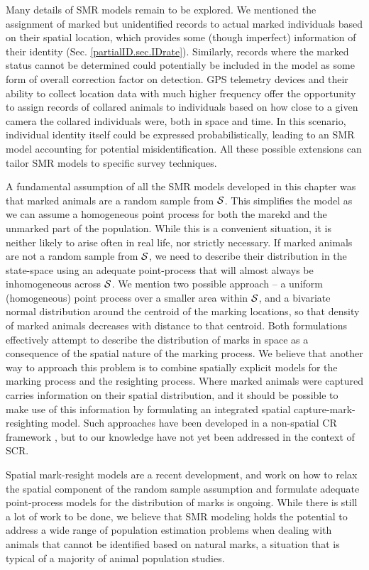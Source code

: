 Many details of SMR models remain to be explored. We mentioned the
assignment of marked but unidentified records to actual marked
individuals based on their spatial location, which provides some
(though imperfect) information of their identity
(Sec. \ref{partialID.sec.IDrate}). Similarly, records where the marked
status cannot be determined could potentially be included in the model
as some form of overall correction factor on detection. GPS telemetry
devices and their ability to collect location data with much higher
frequency offer the opportunity to assign records of collared animals
to individuals based on how close to a given camera the collared
individuals were, both in space and time. In this scenario, individual
identity itself could be expressed probabilistically, leading to an
SMR model accounting for potential misidentification. All these
possible extensions can tailor SMR models to specific survey
techniques.

A fundamental assumption of all the SMR models developed in this
chapter was that marked animals are a random sample from ${\cal
  S}$. This simplifies the model as we can assume a homogeneous point
process for both the marekd and the unmarked part of the
population. While this is a convenient situation, it is neither likely
to arise often in real life, nor strictly necessary.  If marked
animals are not a random sample from ${\cal S}$, we need to describe
their distribution in the state-space using an adequate point-process
that will almost always be inhomogeneous across ${\cal S}$.  We
mention two possible approach -- a uniform (homogeneous) point process
over a smaller area within ${\cal S}$, and a bivariate normal
distribution around the centroid of the marking locations, so that
density of marked animals decreases with distance to that centroid.
Both formulations effectively attempt to describe the distribution of
marks in space as a consequence of the spatial nature of the marking
process. We believe that another way to approach this problem is to
combine spatially explicit models for the marking process and the
resighting process. Where marked animals were captured carries
information on their spatial distribution, and it should be possible
to make use of this information by formulating an integrated spatial
capture-mark-resighting model. Such approaches have been developed in
a non-spatial CR framework \citep{matechou_etal:2013,
  pledger_etal:2009}, but to our knowledge have not yet been addressed
in the context of SCR.

 Spatial mark-resight models are a recent
development, and work on how to relax the spatial component of the
random sample assumption and formulate adequate point-process models for the distribution of marks is ongoing. While there is still a lot of work to be done, we believe that SMR modeling holds the
potential to address a wide range of population estimation problems
when dealing with animals that cannot be identified based on natural
marks, a situation that is typical of a majority of animal population
studies. 



